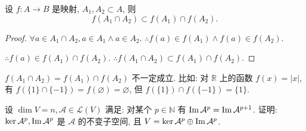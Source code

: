 \documentclass[color=black,device=normal,lang=cn,mode=geye]{elegantnote}
\begin{document}
\begin{lemma}\label{l5.1}
    设 $f:A\to B$ 是映射, $A_1,A_2\subset A$, 则
    \[f(A_1\cap A_2)\subset f(A_1)\cap f(A_2).\]
\end{lemma}
\begin{proof}
    $\forall a\in A_1\cap A_2,a\in A_1\land a\in A_2$. $\therefore f(a)\in f(A_1)\land f(a)\in f(A_2)$.
    
    $\therefore f(a)\in f(A_1)\cap f(A_2)$. $\therefore f(A_1\cap A_2)\subset f(A_1)\cap f(A_2)$.
\end{proof}
\begin{note}
    $f(A_1\cap A_2)=f(A_1)\cap f(A_2)$ 不一定成立. 比如: 对 $\mathbb{R}$ 上的函数 $f(x)=|x|$, 有 $f(\{1\}\cap\{-1\})=f(\varnothing)=\varnothing$, 但 $f(\{1\})\cap f(\{-1\})=\{1\}$.
\end{note}
\begin{exercise}\label{ex3.3}
    设 $\dim V=n,\mathcal{A}\in\mathcal{L}(V)$ 满足: 对某个 $p\in\mathbb{N}$ 有 $\operatorname{Im} \mathcal{A}^p=\operatorname{Im} \mathcal{A}^{p+1}$. 证明: $\ker\mathcal{A}^p,\operatorname{Im} \mathcal{A}^p$ 是 $\mathcal{A}$ 的不变子空间, 且 $V=\ker\mathcal{A}^p\oplus\operatorname{Im} \mathcal{A}^p$.
\end{exercise}
\end{document}
